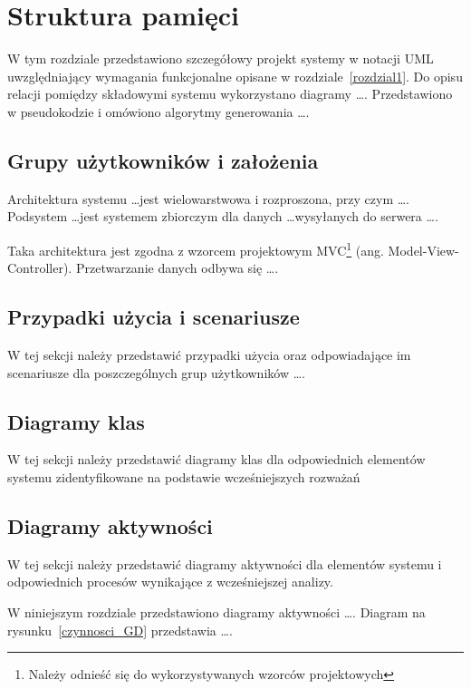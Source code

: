 \chapter{Struktura pamięci}
\thispagestyle{chapterBeginStyle}

\iffalse
{\color{dgray}
W tym rozdziale przedstawiono szczegółowy projekt systemy w notacji UML uwzględniający wymagania funkcjonalne opisane w rozdziale~\ref{rozdzial1}. Do opisu relacji pomiędzy składowymi systemu wykorzystano diagramy \ldots.
Przedstawiono w pseudokodzie i omówiono algorytmy generowania \ldots.
}


\section{Grupy użytkowników i założenia}

{\color{dgray}
Architektura systemu \ldots jest wielowarstwowa i rozproszona, przy czym \ldots. Podsystem  \ldots jest systemem zbiorczym dla danych \ldots wysyłanych do serwera \ldots. 

Taka architektura jest zgodna z wzorcem projektowym MVC\footnote{Należy odnieść się do wykorzystywanych wzorców projektowych} (ang.  Model-View-Controller). Przetwarzanie danych odbywa się \ldots.
} 

\section{Przypadki użycia i scenariusze}

W tej sekcji należy przedstawić przypadki użycia oraz odpowiadające im scenariusze dla poszczególnych grup użytkowników \ldots.

\section{Diagramy klas}

W tej sekcji należy przedstawić diagramy klas dla odpowiednich elementów systemu zidentyfikowane na podstawie wcześniejszych rozważań 

\section{Diagramy aktywności}

W tej sekcji należy przedstawić diagramy aktywności dla elementów systemu i odpowiednich procesów wynikające z wcześniejszej analizy.  

{\color{dgray}
W niniejszym rozdziale przedstawiono diagramy aktywności \ldots. Diagram na rysunku~\ref{czynnosci_GD} przedstawia \ldots.
} 

